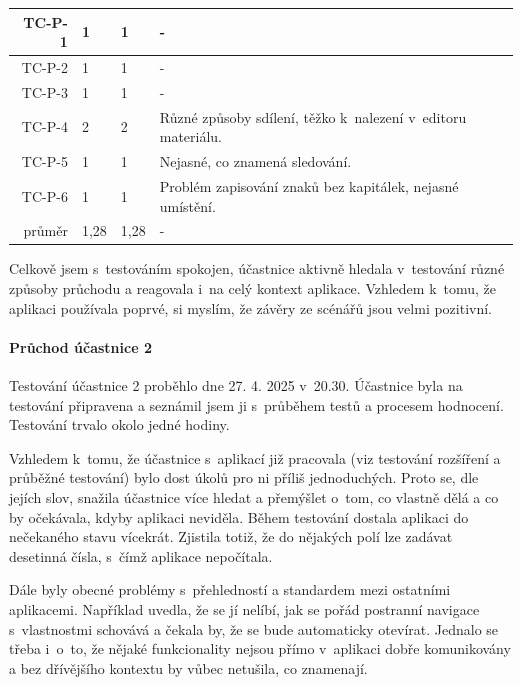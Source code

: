 \begin{longtable}{r|p{2cm}|p{2cm}|p{6cm}}
TC-P-1   & 1 & 1 & - \\\hline
TC-P-2   & 1 & 1 & - \\\hline
TC-P-3   & 1 & 1 & - \\\hline
TC-P-4   & 2 & 2 & Různé způsoby sdílení, těžko k~nalezení v~editoru materiálu. \\\hline
TC-P-5   & 1 & 1 & Nejasné, co znamená sledování. \\\hline
TC-P-6   & 1 & 1 & Problém zapisování znaků bez kapitálek, nejasné umístění. \\\hline\hline
průměr   & 1,28 & 1,28 & - \\
\end{longtable}

Celkově jsem s~testováním spokojen, účastnice aktivně hledala v~testování různé způsoby průchodu a reagovala i~na celý kontext aplikace.
Vzhledem k~tomu, že aplikaci používala poprvé, si myslím, že závěry ze scénářů jsou velmi pozitivní.




\paragraph{Průchod účastnice 2}

Testování účastnice 2 proběhlo dne 27. 4. 2025 v~20.30. 
Účastnice byla na testování připravena a seznámil jsem ji s~průběhem testů a procesem hodnocení. 
Testování trvalo okolo jedné hodiny.

Vzhledem k~tomu, že účastnice s~aplikací již pracovala (viz testování rozšíření a průběžné testování) bylo dost úkolů pro ni příliš jednoduchých. 
Proto se, dle jejích slov, snažila účastnice více hledat a přemýšlet o~tom, co vlastně dělá a co by očekávala, kdyby aplikaci neviděla.
Během testování dostala aplikaci do nečekaného stavu vícekrát.
Zjistila totiž, že do nějakých polí lze zadávat desetinná čísla, s~čímž aplikace nepočítala.

Dále byly obecné problémy s~přehledností a standardem mezi ostatními aplikacemi.
Například uvedla, že se jí nelíbí, jak se pořád postranní navigace s~vlastnostmi schovává a čekala by, že se bude automaticky otevírat. 
Jednalo se třeba i~o~to, že nějaké funkcionality nejsou přímo v~aplikaci dobře komunikovány a bez dřívějšího kontextu by vůbec netušila, co znamenají.

